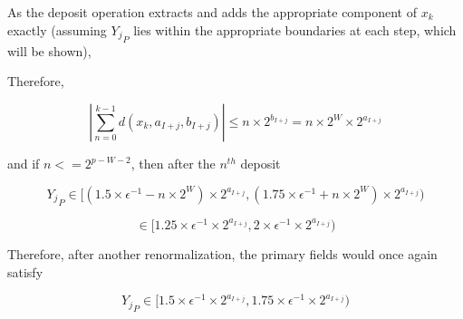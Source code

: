 \documentclass[12pt]{article}
\theoremstyle{plain}
\numberwithin{equation}{section}
\begin{document}
    As the deposit operation extracts and adds the appropriate component of $x_k$ exactly (assuming ${Y_j}_P$ lies within the appropriate boundaries at each step, which will be shown),

    Therefore,

    \begin{equation*}
    |\sum \limits_{n = 0}^{k - 1} d(x_k, a_{I + j}, b_{I + j})| \leq n \times 2^{b_{I + j}} = n \times 2^{W} \times 2^{a_{I + j}}
    \end{equation*}

    and if $n <= 2^{p - W - 2}$, then after the $n^{th}$ deposit

    \begin{equation*}
    {Y_j}_P \in [(1.5 \times \epsilon^{-1} - n \times 2^W)\times 2^{a_{I + j}}, (1.75 \times \epsilon^{-1} + n \times 2^W)\times 2^{a_{I + j}})
    \end{equation*}

    \begin{equation*}
    \in [1.25 \times \epsilon^{-1}\times 2^{a_{I + j}}, 2 \times \epsilon^{-1}\times 2^{a_{I + j}})
    \end{equation*}

    Therefore, after another renormalization, the primary fields would once again satisfy

    \begin{equation*}
    {Y_j}_P \in [1.5 \times \epsilon^{-1}\times 2^{a_{I + j}}, 1.75 \times \epsilon^{-1}\times 2^{a_{I + j}})
    \end{equation*}
\end{document}
